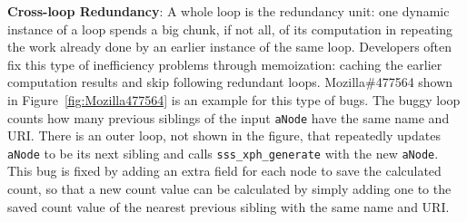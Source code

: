 {\textbf{Cross-loop Redundancy}}:
A whole loop is the redundancy unit:
one dynamic instance of a loop spends a big chunk, if not all, of its
computation in repeating the work already done by an
earlier instance of the same loop.
Developers often fix this type of inefficiency problems through memoization:
caching the earlier computation results and skip following redundant loops.
Mozilla\#477564 shown in Figure~\ref{fig:Mozilla477564} is an example for this type of bugs. 
The buggy loop counts how many previous siblings of the input \texttt{aNode} have the same name and URI. 
There is an outer loop, not shown in the figure, that repeatedly updates
\texttt{aNode} to be its next sibling and calls
\texttt{sss\_xph\_generate} with the new \texttt{aNode}. 
This bug is fixed by adding an extra field for each node to save the calculated 
count, so that a new count value can be calculated by simply adding one to the
saved count value of the nearest previous sibling with the same name and URI.



